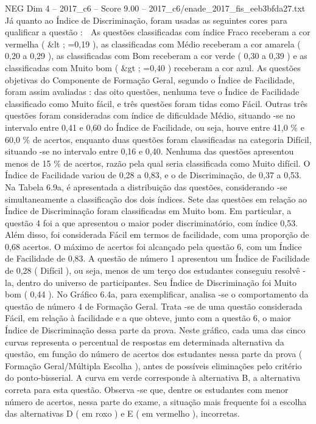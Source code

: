 \begin{textsample}{NEG Dim 4 – 2017\_c6 – Score 9.00 – 2017\_c6/enade\_2017\_fis\_eeb3bfda27.txt}
Já quanto ao Índice de Discriminação, foram usadas as seguintes cores para qualificar a questão :  As questões classificadas com índice Fraco receberam a cor vermelha ( \&lt ; =0,19 ), as classificadas com Médio receberam a cor amarela ( 0,20 a 0,29 ), as classificadas com Bom receberam a cor verde ( 0,30 a 0,39 ) e as classificadas com Muito bom ( \&gt ; =0,40 ) receberam a cor azul.
As questões objetivas do Componente de Formação Geral, segundo o Índice de Facilidade, foram assim avaliadas : das oito questões, nenhuma teve o Índice de Facilidade classificado como Muito fácil, e três questões foram tidas como Fácil.
Outras três questões foram consideradas com índice de dificuldade Médio, situando -se no intervalo entre 0,41 e 0,60 do Índice de Facilidade, ou seja, houve entre 41,0 \% e 60,0 \% de acertos, enquanto duas questões foram classificadas na categoria Difícil, situando -se no intervalo entre 0,16 e 0,40.
Nenhuma das questões apresentou menos de 15 \% de acertos, razão pela qual seria classificada como Muito difícil.
O Índice de Facilidade variou de 0,28 a 0,83, e o de Discriminação, de 0,37 a 0,53.
Na Tabela 6.9a, é apresentada a distribuição das questões, considerando -se simultaneamente a classificação dos dois índices.
Sete das questões em relação ao Índice de Discriminação foram classificadas em Muito bom.
Em particular, a questão 4 foi a que apresentou o maior poder discriminatório, com índice 0,53.
Além disso, foi considerada Fácil em termos de facilidade, com uma proporção de 0,68 acertos.
O máximo de acertos foi alcançado pela questão 6, com um Índice de Facilidade de 0,83.
A questão de número 1 apresentou um Índice de Facilidade de 0,28 ( Difícil ), ou seja, menos de um terço dos estudantes conseguiu resolvê -la, dentro do universo de participantes.
Seu Índice de Discriminação foi Muito bom ( 0,44 ).
No Gráfico 6.4a, para exemplificar, analisa -se o comportamento da questão de número 4 de Formação Geral.
Trata -se de uma questão considerada Fácil, em relação à facilidade e a que obteve, junto com a questão 6, o maior Índice de Discriminação dessa parte da prova.
Neste gráfico, cada uma das cinco curvas representa o percentual de respostas em determinada alternativa da questão, em função do número de acertos dos estudantes nessa parte da prova ( Formação Geral/Múltipla Escolha ), antes de possíveis eliminações pelo critério do ponto-bisserial.
A curva em verde corresponde à alternativa B, a alternativa correta para esta questão.
Observa -se que, dentre os estudantes com menor número de acertos, nessa parte do exame, a situação mais frequente foi a escolha das alternativas D ( em roxo ) e E ( em vermelho ), incorretas.

\end{textsample}
